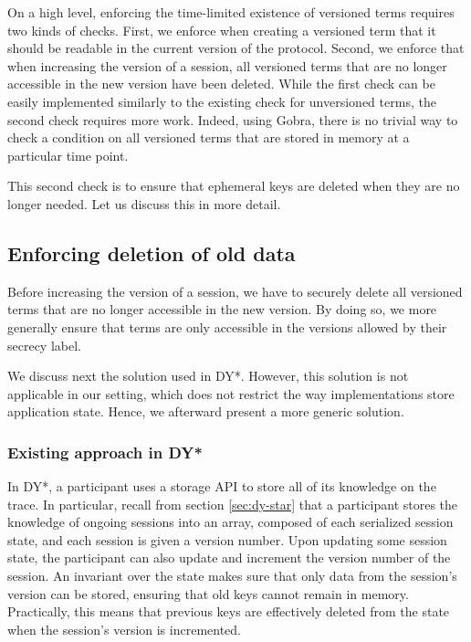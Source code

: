 On a high level, enforcing the time-limited existence of versioned terms requires two kinds of checks.
First, we enforce when creating a versioned term that it should be readable in the current version of the protocol.
Second, we enforce that when increasing the version of a session, all versioned terms that are no longer accessible in the new version have been deleted.
While the first check can be easily implemented similarly to the existing check for unversioned terms, the second check requires more work. Indeed, using Gobra, there is no trivial way to check a condition on all versioned terms that are stored in memory at a particular time point.

This second check is to ensure that ephemeral keys are deleted when they are no longer needed. Let us discuss this in more detail.

\subsection{Enforcing deletion of old data}
\label{sec:enforcing-deletion-of-old-data}

Before increasing the version of a session, we have to securely delete all versioned terms that are no longer accessible in the new version. By doing so, we more generally ensure that terms are only accessible in the versions allowed by their secrecy label.

We discuss next the solution used in DY*. However, this solution is not applicable in our setting, which does not restrict the way implementations store application state. Hence, we afterward present a more generic solution.

\subsubsection{Existing approach in DY*}
\label{sec:existing-approach-in-dy}

In DY*, a participant uses a storage API to store all of its knowledge on the trace.
In particular, recall from section \ref{sec:dy-star} that a participant stores the knowledge of ongoing sessions into an array, composed of each serialized session state, and each session is given a version number.
Upon updating some session state, the participant can also update and increment the version number of the session.
An invariant over the state makes sure that only data from the session's version can be stored, ensuring that old keys cannot remain in memory.
Practically, this means that previous keys are effectively deleted from the state when the session's version is incremented.

